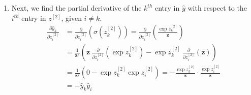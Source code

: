 \documentclass[10pt]{article}
\begin{document}
\begin{enumerate}[label=(\alph*)]
        \item Next, we find the partial derivative of the $k^{th}$ entry in $\hat{y}$ with respect
        to the $i^{th}$ entry in $z^{[2]}$, given $i \neq k$.
        \begin{align*}
            \frac{\partial{\hat{y}_{k}}}{\partial{z^{[2]}_{i}}} &= \frac{\partial}{\partial{z^{[2]}_{i}}} \left( \sigma\left( z^{[2]}_{k} \right) \right)
            = \frac{\partial}{\partial{z^{[2]}_{i}}} \left( \frac{\exp{z^{[2]}_{k}}}{\mathbf{z}} \right) \\
            &= \frac{1}{\mathbf{z}^{2}} \left( \mathbf{z} \ \frac{\partial}{\partial{z^{[2]}_{i}}} \left( \exp{z^{[2]}_{k}} \right) -
            \exp{z^{[2]}_{k}} \ \frac{\partial}{\partial{z^{[2]}_{i}}} \left( \mathbf{z} \right) \right) \\
            &= \frac{1}{\mathbf{z}^{2}} \left( 0 - \exp{z^{[2]}_{k}} \exp{z^{[2]}_{i}} \right)
            = - \frac{\exp{z^{[2]}_{k}}}{\mathbf{z}} \cdot \frac{\exp{z^{[2]}_{i}}}{\mathbf{z}} \\
            &= - \hat{y}_{k} \hat{y}_{i}
        \end{align*}


\end{enumerate}
\end{document}
